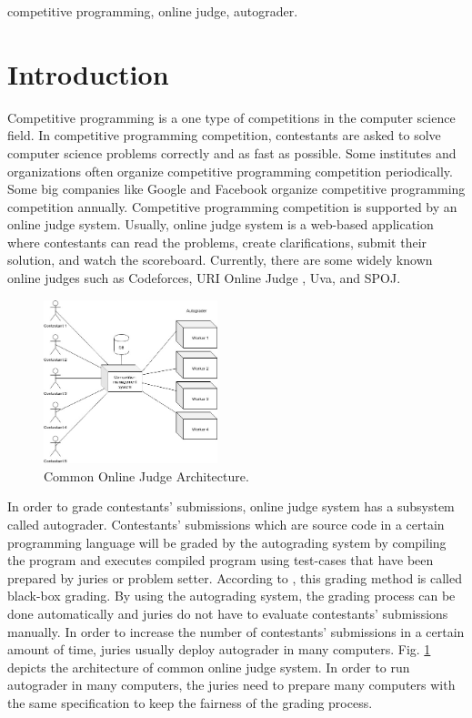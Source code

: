 \documentclass[conference,a4paper]{IEEEtran}
\begin{document}
\begin{IEEEkeywords}
competitive programming, online judge, autograder.
\end{IEEEkeywords}

\section{Introduction}

Competitive programming is a one type of competitions in the computer science field. In competitive programming competition, contestants are asked to solve computer science problems correctly and as fast as possible. Some institutes and organizations often organize competitive programming competition periodically. Some big companies like Google and Facebook organize competitive programming competition annually. Competitive programming competition is supported by an online judge system. Usually, online judge system is a web-based application where contestants can read the problems, create clarifications, submit their solution, and watch the scoreboard. Currently, there are some widely known online judges such as Codeforces, URI Online Judge \cite{uriojpaper}, Uva, and SPOJ.

\begin{figure}[htbp]
\centerline{\includegraphics[width=0.45\textwidth]{images/paper-architecture-old.jpeg}}
\caption{Common Online Judge Architecture.}
\label{architecture-old}
\end{figure}

In order to grade contestants' submissions, online judge system has a subsystem called autograder. Contestants' submissions which are source code in a certain programming language will be graded by the autograding system by compiling the program and executes compiled program using test-cases that have been prepared by juries or problem setter. According to \cite{jordanioi}, this grading method is called black-box grading. By using the autograding system, the grading process can be done automatically and juries do not have to evaluate contestants' submissions manually. In order to increase the number of contestants' submissions in a certain amount of time, juries usually deploy autograder in many computers. Fig. \ref{architecture-old} depicts the architecture of common online judge system. In order to run autograder in many computers, the juries need to prepare many computers with the same specification to keep the fairness of the grading process.
\end{document}

